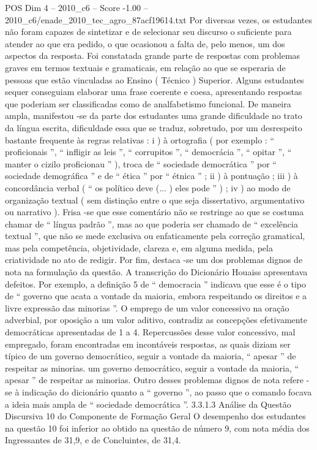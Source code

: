 \begin{textsample}{POS Dim 4 – 2010\_c6 – Score -1.00 – 2010\_c6/enade\_2010\_tec\_agro\_87acf19614.txt}
Por diversas vezes, os estudantes não foram capazes de sintetizar e de selecionar seu discurso o suficiente para atender ao que era pedido, o que ocasionou a falta de, pelo menos, um dos aspectos da resposta.
Foi constatada grande parte de respostas com problemas graves em termos textuais e gramaticais, em relação ao que se esperaria de pessoas que estão vinculadas ao Ensino ( Técnico ) Superior.
Alguns estudantes sequer conseguiam elaborar uma frase coerente e coesa, apresentando respostas que poderiam ser classificadas como de analfabetismo funcional.
De maneira ampla, manifestou -se da parte dos estudantes uma grande dificuldade no trato da língua escrita, dificuldade essa que se traduz, sobretudo, por um desrespeito bastante frequente às regras relativas : i ) à ortografia ( por exemplo : “ proficionais ”, “ infligir as leis ”, “ corrupitos ”, “ democrácia ”, “ opitar ”, “ manter o cizilo proficionau ” ), troca de “ sociedade democrática ” por “ sociedade demográfica ” e de “ ética ” por “ étnica ” ; ii ) à pontuação ; iii ) à concordância verbal ( “ os político deve (... ) eles pode ” ) ; iv ) ao modo de organização textual ( sem distinção entre o que seja dissertativo, argumentativo ou narrativo ).
Frisa -se que esse comentário não se restringe ao que se costuma chamar de “ língua padrão ”, mas ao que poderia ser chamado de “ excelência textual ”, que não se mede exclusiva ou enfaticamente pela correção gramatical, mas pela competência, objetividade, clareza e, em alguma medida, pela criatividade no ato de redigir.
Por fim, destaca -se um dos problemas dignos de nota na formulação da questão.
A transcrição do Dicionário Houaiss apresentava defeitos.
Por exemplo, a definição 5 de “ democracia ” indicava que esse é o tipo de “ governo que acata a vontade da maioria, embora respeitando os direitos e a livre expressão das minorias ”.
O emprego de um valor concessivo na oração adverbial, por oposição a um valor aditivo, contradiz as concepções efetivamente democráticas apresentadas de 1 a 4.
Repercussões desse valor concessivo, mal empregado, foram encontradas em incontáveis respostas, as quais diziam ser típico de um governo democrático, seguir a vontade da maioria, “ apesar ” de respeitar as minorias. um governo democrático, seguir a vontade da maioria, “ apesar ” de respeitar as minorias.
Outro desses problemas dignos de nota refere -se à indicação do dicionário quanto a “ governo ”, ao passo que o comando focava a ideia mais ampla de “ sociedade democrática ”. 3.3.1.3 Análise da Questão Discursiva 10 do Componente de Formação Geral O desempenho dos estudantes na questão 10 foi inferior ao obtido na questão de número 9, com nota média dos Ingressantes de 31,9, e de Concluintes, de 31,4.

\end{textsample}
